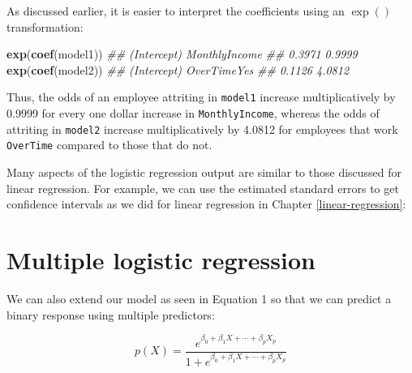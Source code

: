 \documentclass[]{krantz}
\makeatletter
\newenvironment{Shaded}{\begin{snugshade}}{\end{snugshade}}
\newcommand{\CommentTok}[1]{\textcolor[rgb]{0.37,0.37,0.37}{\textit{#1}}}
\newcommand{\KeywordTok}[1]{\textcolor[rgb]{0.27,0.27,0.27}{\textbf{#1}}}
\newcommand{\NormalTok}[1]{#1}
\newenvironment{kframe}{%
\medskip{}
\setlength{\fboxsep}{.8em}
 \def\at@end@of@kframe{}%
 \ifinner\ifhmode%
  \def\at@end@of@kframe{\end{minipage}}%
  \begin{minipage}{\columnwidth}%
 \fi\fi%
 \def\FrameCommand##1{\hskip\@totalleftmargin \hskip-\fboxsep
 \colorbox{shadecolor}{##1}\hskip-\fboxsep
     \hskip-\linewidth \hskip-\@totalleftmargin \hskip\columnwidth}%
 \MakeFramed {\advance\hsize-\width
   \@totalleftmargin\z@ \linewidth\hsize
   \@setminipage}}%
 {\par\unskip\endMakeFramed%
 \at@end@of@kframe}
\renewenvironment{Shaded}{\begin{kframe}}{\end{kframe}}
\makeatother
\begin{document}
As discussed earlier, it is easier to interpret the coefficients using an \(\exp()\) transformation:

\begin{Shaded}
\begin{Highlighting}[]
\KeywordTok{exp}\NormalTok{(}\KeywordTok{coef}\NormalTok{(model1))}
\CommentTok{##   (Intercept) MonthlyIncome }
\CommentTok{##        0.3971        0.9999}
\KeywordTok{exp}\NormalTok{(}\KeywordTok{coef}\NormalTok{(model2))}
\CommentTok{## (Intercept) OverTimeYes }
\CommentTok{##      0.1126      4.0812}
\end{Highlighting}
\end{Shaded}

Thus, the odds of an employee attriting in \texttt{model1} increase multiplicatively by 0.9999 for every one dollar increase in \texttt{MonthlyIncome}, whereas the odds of attriting in \texttt{model2} increase multiplicatively by 4.0812 for employees that work \texttt{OverTime} compared to those that do not.

Many aspects of the logistic regression output are similar to those discussed for linear regression. For example, we can use the estimated standard errors to get confidence intervals as we did for linear regression in Chapter \ref{linear-regression}:

\begin{Shaded}
\end{Shaded}

\hypertarget{multiple-logistic-regression}{%
\section{Multiple logistic regression}\label{multiple-logistic-regression}}

We can also extend our model as seen in Equation 1 so that we can predict a binary response using multiple predictors:

\begin{equation}
\label{eq:multi-logistic}
p\left(X\right) = \frac{e^{\beta_0 + \beta_1 X + \cdots + \beta_p X_p }}{1 + e^{\beta_0 + \beta_1 X + \cdots + \beta_p X_p}} 
\end{equation}
\end{document}
